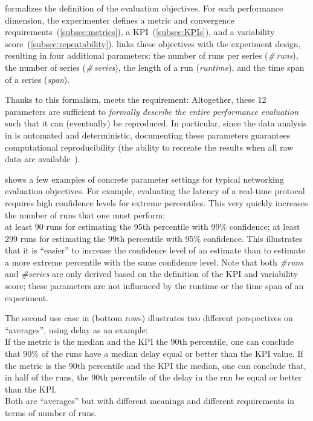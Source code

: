 \triscale formalizes the definition of the evaluation objectives. For each performance dimension, the experimenter defines a metric and convergence requirements~(\cref{subsec:metrics}), a KPI~(\cref{subsec:KPIs}), and a variability score~(\cref{subsec:repeatability}).
\triscale links these objectives with the experiment design, resulting in four additional parameters: the number of runs per series (\emph{\#\,runs}), the number of series (\emph{\#\,series}), the length of a run (\emph{runtime}), and the time span of a series (\emph{span}).

Thanks to this formalism, \triscale meets the  requirement:
Altogether, these 12 parameters are sufficient to \emph{formally describe the entire performance evaluation} such that it can (eventually) be reproduced.
In particular, since the data analysis in \triscale is automated and deterministic, documenting these parameters guarantees computational reproducibility (the ability to recreate the results when all raw data are available~\cite{liu19computational}).

 shows a few examples of concrete parameter settings for typical networking evaluation objectives.
For example, evaluating the latency of a real-time protocol requires high confidence levels for extreme percentiles.
This very quickly increases the number of runs that one must perform:\\
\inlineitem
  at least 90 runs for estimating the 95th percentile with 99\% confidence;\linebreak
\inlineitem
  at least 299 runs for estimating the 99th percentile with 95\% confidence.\linebreak
This illustrates that it is ``easier'' to increase the confidence level of an estimate than to estimate a more extreme percentile with the same confidence level.
Note that both \emph{\#runs} and \emph{\#series} are only derived based on the definition of the KPI and variability score; these parameters are not influenced by the runtime or the time span of an experiment.

The second use case in  (bottom rows) illustrates two different perspectives on ``averages'', using delay as an example:\\
\inlineitem
  If the metric is the median and the KPI the 90th percentile, one can conclude that 90\% of the runs have a median delay equal or better than the KPI value.\linebreak
\inlineitem
  If the metric is the 90th percentile and the KPI the median, one can conclude that, in half of the runs, the 90th percentile of the delay in the run be equal or better than the KPI.\\
Both are ``averages'' but with different meanings and different requirements in terms of number of runs.


